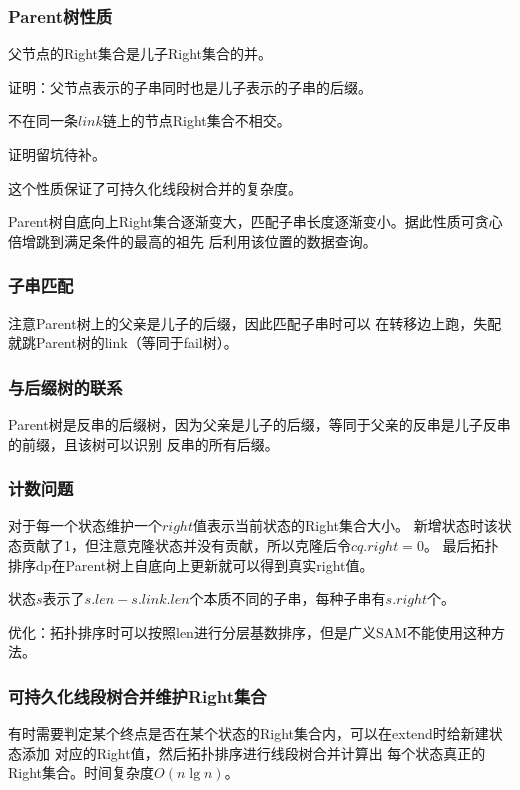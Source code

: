\subsubsection{Parent树性质}
\begin{theorem}
    父节点的Right集合是儿子Right集合的并。
\end{theorem}

证明：父节点表示的子串同时也是儿子表示的子串的后缀。

\begin{theorem}
    不在同一条$link$链上的节点Right集合不相交。
\end{theorem}

证明留坑待补。

这个性质保证了可持久化线段树合并的复杂度。

Parent树自底向上Right集合逐渐变大，匹配子串长度逐渐变小。据此性质可贪心倍增跳到满足条件的最高的祖先
后利用该位置的数据查询。
\subsubsection{子串匹配}
注意Parent树上的父亲是儿子的后缀，因此匹配子串时可以
在转移边上跑，失配就跳Parent树的link（等同于fail树）。
\subsubsection{与后缀树的联系}
Parent树是反串的后缀树，因为父亲是儿子的后缀，等同于父亲的反串是儿子反串的前缀，且该树可以识别
反串的所有后缀。
\subsubsection{计数问题}
对于每一个状态维护一个$right$值表示当前状态的Right集合大小。
新增状态时该状态贡献了1，但注意克隆状态并没有贡献，所以克隆后令$cq.right=0$。
最后拓扑排序dp在Parent树上自底向上更新就可以得到真实right值。

状态$s$表示了$s.len-s.link.len$个本质不同的子串，每种子串有$s.right$个。

优化：拓扑排序时可以按照len进行分层基数排序，但是广义SAM不能使用这种方法。
\subsubsection{可持久化线段树合并维护Right集合}
有时需要判定某个终点是否在某个状态的Right集合内，可以在extend时给新建状态添加
对应的Right值，然后拓扑排序进行线段树合并计算出
每个状态真正的Right集合。时间复杂度$O(n\lg n)$。

